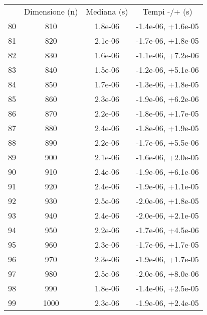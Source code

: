 \begin{table}
\centering
\begin{adjustbox}{width=1\textwidth/2}
\begin{tabular}{|c|c|c|c|}
\hline
 & Dimensione (n) & Mediana (s) & Tempi -/+ (s) \\
80 & 810 & 1.8e-06 & -1.4e-06, +1.6e-05 \\
\cline{1-4}
81 & 820 & 2.1e-06 & -1.7e-06, +1.8e-05 \\
\cline{1-4}
82 & 830 & 1.6e-06 & -1.1e-06, +7.2e-06 \\
\cline{1-4}
83 & 840 & 1.5e-06 & -1.2e-06, +5.1e-06 \\
\cline{1-4}
84 & 850 & 1.7e-06 & -1.3e-06, +1.8e-05 \\
\cline{1-4}
85 & 860 & 2.3e-06 & -1.9e-06, +6.2e-06 \\
\cline{1-4}
86 & 870 & 2.2e-06 & -1.8e-06, +1.7e-05 \\
\cline{1-4}
87 & 880 & 2.4e-06 & -1.8e-06, +1.9e-05 \\
\cline{1-4}
88 & 890 & 2.2e-06 & -1.7e-06, +5.5e-06 \\
\cline{1-4}
89 & 900 & 2.1e-06 & -1.6e-06, +2.0e-05 \\
\cline{1-4}
90 & 910 & 2.4e-06 & -1.9e-06, +6.1e-06 \\
\cline{1-4}
91 & 920 & 2.4e-06 & -1.9e-06, +1.1e-05 \\
\cline{1-4}
92 & 930 & 2.5e-06 & -2.0e-06, +1.8e-05 \\
\cline{1-4}
93 & 940 & 2.4e-06 & -2.0e-06, +2.1e-05 \\
\cline{1-4}
94 & 950 & 2.2e-06 & -1.7e-06, +4.5e-06 \\
\cline{1-4}
95 & 960 & 2.3e-06 & -1.7e-06, +1.7e-05 \\
\cline{1-4}
96 & 970 & 2.3e-06 & -1.9e-06, +1.7e-05 \\
\cline{1-4}
97 & 980 & 2.5e-06 & -2.0e-06, +8.0e-06 \\
\cline{1-4}
98 & 990 & 1.8e-06 & -1.4e-06, +2.5e-05 \\
\cline{1-4}
99 & 1000 & 2.3e-06 & -1.9e-06, +2.4e-05 \\
\cline{1-4}
\end{tabular}
\end{adjustbox}
\end{table}
